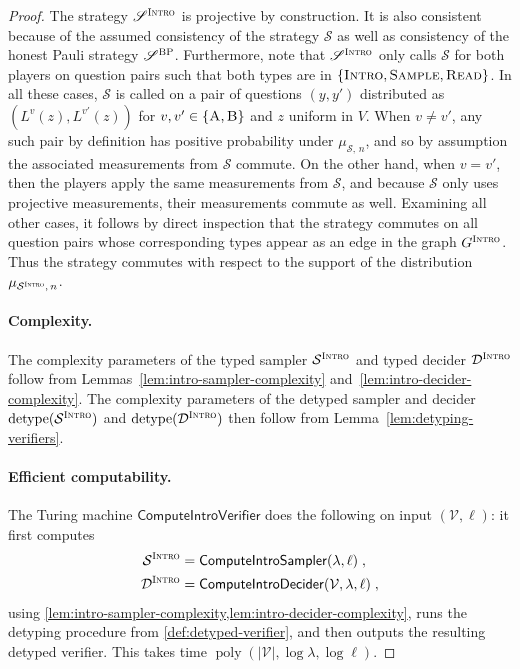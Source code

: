\documentclass[11pt]{article}
\theoremstyle{definition}
\DeclareMathOperator{\poly}{poly}
\newcommand{\abs}[1]{\left\vert {#1} \right\vert}
\newcommand{\sampler}{\mathcal{S}}
\newcommand{\decider}{\mathcal{D}}
\newcommand{\verifier}{\mathcal{V}}
\newcommand{\strategy}{\mathscr{S}}
\newcommand{\detype}{\mathrm{detype}}
\newcommand{\gamestyle}[1]{\ensuremath{\textsc{#1}}\xspace}
\newcommand{\bp}{\gamestyle{BP}}
\newcommand{\intro}{\gamestyle{Intro}}
\newcommand{\labelstyle}[1]{\ensuremath{\textsc{#1}}\xspace}
\newcommand{\trole}{\ensuremath{v}} %
\newcommand{\alice}{\labelstyle{A}}
\newcommand{\bob}{\labelstyle{B}}
\newcommand{\typestyle}[1]{\ensuremath{\textsc{#1}}\xspace}
\newcommand{\Sample}{\typestyle{Sample}}
\newcommand{\Read}{\typestyle{Read}}
\newcommand{\Introspect}{\typestyle{Intro}}
\newcommand{\tmstyle}[1]{\ensuremath{\mathsf{#1}}}
\newcommand{\ComputeIntroSampler}{\tmstyle{ComputeIntroSampler}}
\newcommand{\ComputeIntroDecider}{\tmstyle{ComputeIntroDecider}}
\newcommand{\ComputeIntroVerifier}{\tmstyle{ComputeIntroVerifier}}
\begin{document}
\begin{proof}
The strategy $\strategy^\intro$ is projective by construction.
It is also consistent because of the assumed consistency of the strategy
$\strategy$ as well as consistency of the honest Pauli strategy $\strategy^\bp$.
Furthermore, note that $\strategy^\intro$ only calls $\strategy$ for both
players on question pairs such that both types are in
$\{\Introspect,\Sample,\Read\}$.
In all these cases, $\strategy$ is called on a pair of questions $(y,y')$
distributed as $(L^\trole(z),L^{\trole'}(z))$ for
$\trole,\trole'\in\{\alice,\bob\}$ and $z$ uniform in $V$.
When $v \neq v'$, any such pair by definition has positive probability under
$\mu_{\sampler,\, n}$, and so by assumption the associated measurements from
$\strategy$ commute.
On the other hand, when $v = v'$, then the players apply the same measurements
from $\strategy$, and because $\strategy$ only uses projective measurements,
their measurements commute as well.
Examining all other cases, it follows by direct inspection that the strategy
commutes on all question pairs whose corresponding types appear as an edge in
the graph $G^\intro$.
Thus the strategy commutes with respect to the support of the distribution
$\mu_{\sampler^\intro,\, n}$.

\paragraph{Complexity.}
The complexity parameters of the typed sampler $\sampler^\intro$ and typed
decider $\decider^\intro$ follow from Lemmas~\ref{lem:intro-sampler-complexity}
and~\ref{lem:intro-decider-complexity}.
The complexity parameters of the detyped sampler and decider
$\detype(\sampler^\intro)$ and $\detype(\decider^\intro)$ then follow from
Lemma~\ref{lem:detyping-verifiers}.

\paragraph{Efficient computability.}
The Turing machine $\ComputeIntroVerifier$ does the following on input
$(\verifier, \ell)$: it first computes
\begin{align*}
  \sampler^\intro & = \ComputeIntroSampler(\lambda,\ell)\;,\\
  \decider^\intro & = \ComputeIntroDecider(\verifier, \lambda, \ell)\;,
\end{align*}
using \cref{lem:intro-sampler-complexity,lem:intro-decider-complexity}, runs
the detyping procedure from \cref{def:detyped-verifier}, and then outputs the
resulting detyped verifier.
This takes time $\poly(\abs{\verifier}, \log\lambda, \log\ell)$.
\end{proof}
\end{document}
